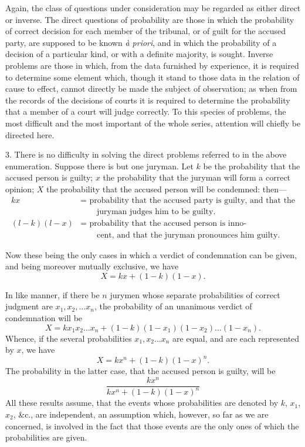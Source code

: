 \documentclass[oneside]{book}
\begin{document}
Again, the class of questions under consideration may be
regarded as either direct or inverse. The direct questions of probability are those in which the probability of correct decision
for each member of the tribunal, or of guilt for the accused
party, are supposed to be known \textit{\`{a} priori}, and in which the probability of a decision of a particular kind, or with a definite majority,
is sought. Inverse problems are those in which, from the data furnished by experience, it is required to determine some element
which, though it stand to those data in the relation of cause to
effect, cannot directly be made the subject of observation; as
when from the records of the decisions of courts it is required to
determine the probability that a member of a court will judge
correctly. To this species of problems, the most difficult and
the most important of the whole series, attention will chiefly be
directed here.

3. There is no difficulty in solving the direct problems referred to in the above enumeration. Suppose there is but one
juryman. Let $k$ be the probability that the accused person is
guilty; $x$ the probability that the juryman will form a correct
opinion; $X$ the probability that the accused person will be condemned: then---
\begin{align*}
  kx &= \text{ probability that the accused party is guilty, and that the}\\
  & \qquad \text{juryman judges him to be guilty.}
\\
  (l-k)(l-x) &= \text{ probability that the accused person is inno-}\\
  & \qquad \text{cent, and that the juryman pronounces him guilty.}
\end{align*}

Now these being the only cases in which a verdict of condemnation can be given, and being moreover mutually exclusive,
we have
\[
  X = kx + (1-k)(1-x).    \tag{1}
\]

In like manner, if there be $n$ jurymen whose separate probabilities of correct judgment are $x_1, x_2, \dotsc x_n$, the probability of an
unanimous verdict of condemnation will be
\[
  X = k x_1 x_2 \dotsc x_n + (1-k)(1-x_1)(1-x_2)\dotsc (1-x_n).
\]
Whence, if the several probabilities $x_1, x_2 \dotsc x_n$ are equal, and are
each represented by $x$, we have
\[
  X = kx^n + (1-k)(1-x)^n.   \tag{2}
\]
The probability in the latter case, that the accused person is guilty,
will be
\[
  \frac{kx^n}{kx^n + (1-k)(1-x)^n}
\]
All these results assume, that the events whose probabilities
are denoted by $k$, $x_1$, $x_2$, \&c., are independent, an assumption
which, however, so far as we are concerned, is involved in the
fact that those events are the only ones of which the probabilities
are given.
\end{document}
